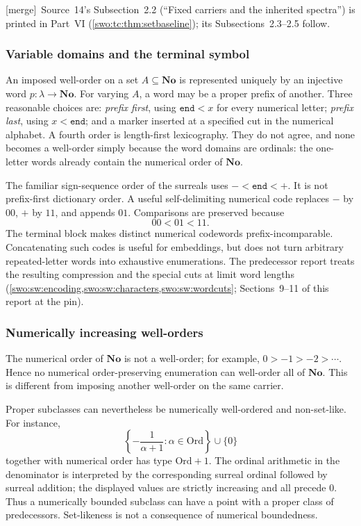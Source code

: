 \documentclass[11pt]{article}
\theoremstyle{definition}
\theoremstyle{remark}
\newcommand{\No}{\mathbf{No}}
\newcommand{\Ord}{\mathrm{Ord}}
\newcommand{\End}{\mathtt{end}}
\newcommand{\merge}{\textsf{[merge]}}
\begin{document}
\merge\ Source~14's Subsection~2.2 (``Fixed carriers and the inherited
spectra'') is printed in Part~VI (\cref{swo:tc:thm:setbaseline}); its
Subsections~2.3--2.5 follow.

\subsubsection{Variable domains and the terminal symbol}
An imposed well-order on a set $A\subseteq\No$ is represented uniquely
by an injective word $p:\lambda\to\No$. For varying $A$, a word may be a
proper prefix of another. Three reasonable choices are:
\emph{prefix first}, using $\End<x$ for every numerical letter;
\emph{prefix last}, using $x<\End$; and a marker inserted at a specified
cut in the numerical alphabet. A fourth order is length-first lexicography.
They do not agree, and none becomes a well-order simply because the
word domains are ordinals: the one-letter words already contain the
numerical order of $\No$.

The familiar sign-sequence order of the surreals uses
$-<\End<+$. It is not prefix-first dictionary order. A useful
self-delimiting numerical code replaces $-$ by $00$, $+$ by $11$, and
appends $01$. Comparisons are preserved because
\[
 00<01<11.
\]
The terminal block makes distinct numerical codewords
prefix-incomparable. Concatenating such codes is useful for embeddings,
but does not turn arbitrary repeated-letter words into exhaustive
enumerations. The predecessor report treats the resulting compression
and the special cuts at limit word lengths (\cref{swo:sw:encoding,swo:sw:characters,swo:sw:wordcuts}; Sections~9--11 of this report at the pin).

\subsubsection{Numerically increasing well-orders}
The numerical order of $\No$ is not a well-order; for example,
$0>-1>-2>\cdots$. Hence no numerical order-preserving enumeration can
well-order all of $\No$. This is different from imposing another
well-order on the same carrier.

Proper subclasses can nevertheless be numerically well-ordered and
non-set-like. For instance,
\[
 \left\{-\frac1{\alpha+1}:\alpha\in\Ord\right\}\cup\{0\}
\]
together with numerical order has type $\Ord+1$. The ordinal arithmetic
in the denominator is interpreted by the corresponding surreal ordinal
followed by surreal addition; the displayed values are strictly
increasing and all precede $0$. Thus a numerically bounded subclass can
have a point with a proper class of predecessors. Set-likeness is not a
consequence of numerical boundedness.
\end{document}
